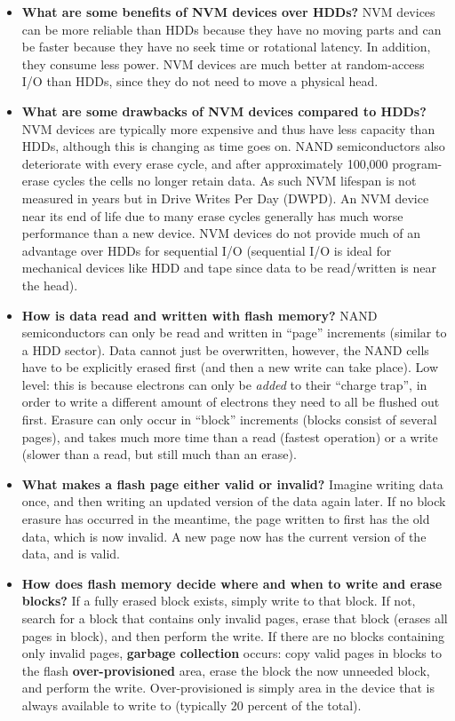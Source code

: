 \documentclass[12pt]{article}
\begin{document}
\begin{itemize}
    \item \textbf{What are some benefits of NVM devices over HDDs?} NVM devices can be more reliable than HDDs because they have no moving parts and can be faster because they have no seek time or rotational latency. In addition, they consume less power. NVM devices are much better at random-access I/O than HDDs, since they do not need to move a physical head.
    \item \textbf{What are some drawbacks of NVM devices compared to HDDs?} NVM devices are typically more expensive and thus have less capacity than HDDs, although this is changing as time goes on. NAND semiconductors also deteriorate with every erase cycle, and after approximately 100,000 program-erase cycles the cells no longer retain data. As such NVM lifespan is not measured in years but in Drive Writes Per Day (DWPD). An NVM device near its end of life due to many erase cycles generally has much worse performance than a new device. NVM devices do not provide much of an advantage over HDDs for sequential I/O (sequential I/O is ideal for mechanical devices like HDD and tape since data to be read/written is near the head).
    \item \textbf{How is data read and written with flash memory?} NAND semiconductors can only be read and written in ``page'' increments (similar to a HDD sector). Data cannot just be overwritten, however, the NAND cells have to be explicitly erased first (and then a new write can take place). Low level: this is because electrons can only be \textit{added} to their ``charge trap'', in order to write a different amount of electrons they need to all be flushed out first. Erasure can only occur in ``block'' increments (blocks consist of several pages), and takes much more time than a read (fastest operation) or a write (slower than a read, but still much than an erase).
    \item \textbf{What makes a flash page either valid or invalid?} Imagine writing data once, and then writing an updated version of the data again later. If no block erasure has occurred in the meantime, the page written to first has the old data, which is now invalid. A new page now has the current version of the data, and is valid.
    \item \textbf{How does flash memory decide where and when to write and erase blocks?} If a fully erased block exists, simply write to that block. If not, search for a block that contains only invalid pages, erase that block (erases all pages in block), and then perform the write. If there are no blocks containing only invalid pages, \textbf{garbage collection} occurs: copy valid pages in blocks to the flash \textbf{over-provisioned} area, erase the block the now unneeded block, and perform the write. Over-provisioned is simply area in the device that is always available to write to (typically 20 percent of the total).

\end{itemize}
\end{document}
